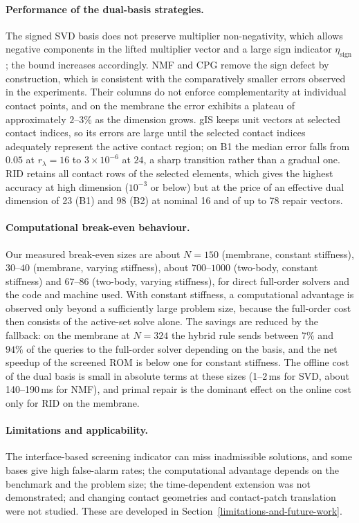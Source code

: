 \documentclass[11pt,a4paper]{article}
\begin{document}
\paragraph{Performance of the dual-basis strategies.} The signed SVD basis does not preserve multiplier non-negativity, which allows negative components in the lifted multiplier vector and a large sign indicator $\eta_{\mathrm{sign}}$; the bound increases accordingly. NMF and CPG remove the sign defect by construction, which is consistent with the comparatively smaller errors observed in the experiments. Their columns do not enforce complementarity at individual contact points, and on the membrane the error exhibits a plateau of approximately $2$--$3\%$ as the dimension grows. gIS keeps unit vectors at selected contact indices, so its errors are large until the selected contact indices adequately represent the active contact region; on B1 the median error falls from $0.05$ at $r_\lambda = 16$ to $3\times10^{-6}$ at $24$, a sharp transition rather than a gradual one. RID retains all contact rows of the selected elements, which gives the highest accuracy at high dimension ($10^{-3}$ or below) but at the price of an effective dual dimension of 23 (B1) and 98 (B2) at nominal 16 and of up to 78 repair vectors.

\paragraph{Computational break-even behaviour.} Our measured break-even sizes are about $N = 150$ (membrane, constant stiffness), $30$--$40$ (membrane, varying stiffness), about $700$--$1000$ (two-body, constant stiffness) and $67$--$86$ (two-body, varying stiffness), for direct full-order solvers and the code and machine used. With constant stiffness, a computational advantage is observed only beyond a sufficiently large problem size, because the full-order cost then consists of the active-set solve alone. The savings are reduced by the fallback: on the membrane at $N = 324$ the hybrid rule sends between $7\%$ and $94\%$ of the queries to the full-order solver depending on the basis, and the net speedup of the screened ROM is below one for constant stiffness. The offline cost of the dual basis is small in absolute terms at these sizes (1--2\,ms for SVD, about 140--190\,ms for NMF), and primal repair is the dominant effect on the online cost only for RID on the membrane.

\paragraph{Limitations and applicability.} The interface-based screening indicator can miss inadmissible solutions, and some bases give high false-alarm rates; the computational advantage depends on the benchmark and the problem size; the time-dependent extension was not demonstrated; and changing contact geometries and contact-patch translation were not studied. These are developed in Section~\ref{limitations-and-future-work}.
\end{document}
